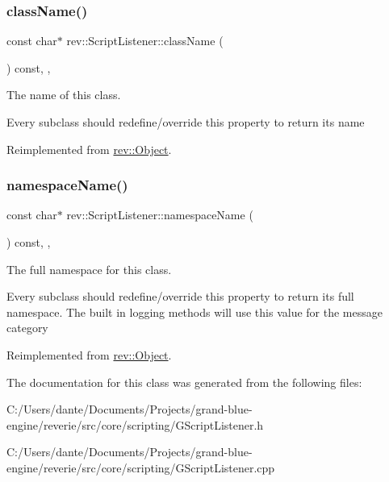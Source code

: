 \subsubsection{\texorpdfstring{className()}{className()}}
{\footnotesize\ttfamily const char$\ast$ rev\+::\+Script\+Listener\+::class\+Name (\begin{DoxyParamCaption}{ }\end{DoxyParamCaption}) const\hspace{0.3cm}{\ttfamily [inline]}, {\ttfamily [override]}, {\ttfamily [virtual]}}



The name of this class. 

Every subclass should redefine/override this property to return its name 

Reimplemented from \mbox{\hyperlink{classrev_1_1_object_a7a2013f91169479b65cf93afdc5d9a68}{rev\+::\+Object}}.

\mbox{\label{classrev_1_1_script_listener_aec59340a0007e966eb08f9fb28c0bdac}} 
\subsubsection{\texorpdfstring{namespaceName()}{namespaceName()}}
{\footnotesize\ttfamily const char$\ast$ rev\+::\+Script\+Listener\+::namespace\+Name (\begin{DoxyParamCaption}{ }\end{DoxyParamCaption}) const\hspace{0.3cm}{\ttfamily [inline]}, {\ttfamily [override]}, {\ttfamily [virtual]}}



The full namespace for this class. 

Every subclass should redefine/override this property to return its full namespace. The built in logging methods will use this value for the message category 

Reimplemented from \mbox{\hyperlink{classrev_1_1_object_aaeb638d3e10f361c56c211a318a27f3d}{rev\+::\+Object}}.



The documentation for this class was generated from the following files\+:\begin{DoxyCompactItemize}
\item 
C\+:/\+Users/dante/\+Documents/\+Projects/grand-\/blue-\/engine/reverie/src/core/scripting/G\+Script\+Listener.\+h\item 
C\+:/\+Users/dante/\+Documents/\+Projects/grand-\/blue-\/engine/reverie/src/core/scripting/G\+Script\+Listener.\+cpp\end{DoxyCompactItemize}

